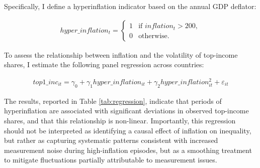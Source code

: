\documentclass[a4paper, 12pt]{article}
\begin{document}
\par
Specifically, I define a hyperinflation indicator based on the annual GDP deflator:

\begin{align}
hyper\_inflation_t =
\begin{cases} 
1 & \text{if } inflation_t > 200, \\ 
0 & \text{otherwise.}
\end{cases}
\end{align}

To assess the relationship between inflation and the volatility of top-income shares, I estimate the following panel regression across countries:

\begin{align}
top1\_inc_{it} = \gamma_0 + \gamma_1 hyper\_inflation_{it} + \gamma_2 hyper\_inflation_{it}^2 + \varepsilon_{it}
\end{align}

The results, reported in Table \ref{tab:regression}, indicate that periods of hyperinflation are associated with significant deviations in observed top-income shares, and that this relationship is non-linear. 
Importantly, this regression should not be interpreted as identifying a causal effect of inflation on inequality, but rather as capturing systematic patterns consistent with increased measurement noise during high-inflation episodes, but as a smoothing treatment to mitigate fluctuations partially attributable to measurement issues.
\end{document}
